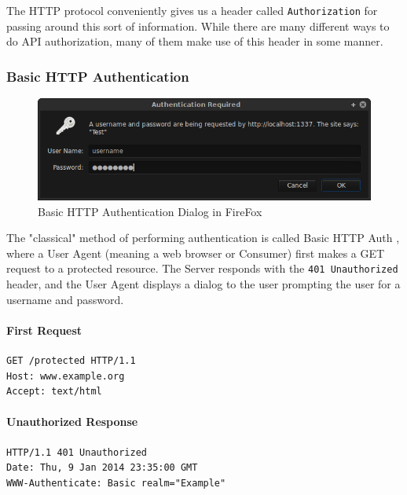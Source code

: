 \documentclass{book}
\begin{document}
The HTTP protocol conveniently gives us a header called \texttt{Authorization} for passing around this sort of information. While there are many different ways to do API authorization, many of them make use of this header in some manner.

\subsubsection{Basic HTTP Authentication}

\begin{figure}[ht!]
\centering
\includegraphics[width=140mm]{images/basic-http-auth.png}
\caption{Basic HTTP Authentication Dialog in FireFox}
\label{fig:basichhtpauth}
\end{figure}

The "classical" method of performing authentication is called Basic HTTP Auth \cite{RFC2617}, where a User Agent (meaning a web browser or Consumer) first makes a GET request to a protected resource. The Server responds with the \texttt{401 Unauthorized} header, and the User Agent displays a dialog to the user prompting the user for a username and password.

\paragraph{\textbf{First Request}}

\begin{verbatim}
GET /protected HTTP/1.1
Host: www.example.org
Accept: text/html
\end{verbatim}

\paragraph{\textbf{Unauthorized Response}}

\begin{verbatim}
HTTP/1.1 401 Unauthorized
Date: Thu, 9 Jan 2014 23:35:00 GMT
WWW-Authenticate: Basic realm="Example"
\end{verbatim}
\end{document}
